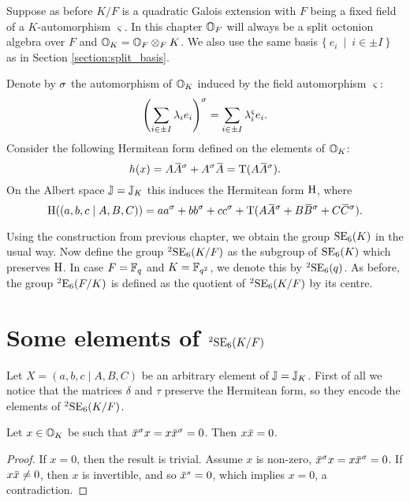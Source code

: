 Suppose as before $K / F$ is a quadratic Galois extension with $F$ being a fixed field of a
$K$-automorphism $\varsigma$. In this chapter $\mathbb{O}_F$ will always be a split octonion algebra 
over $F$ and $\mathbb{O}_K = \mathbb{O}_F \otimes_F K$. We also use the same basis 
$\{\ e_i\ \mid\ i \in \pm I\ \}$ as in Section \ref{section:split_basis}.

Denote by $\sigma$ the automorphism of $\mathbb{O}_K$ induced by the field automorphism 
$\varsigma$:
\begin{equation}
	\left( \sum_{i\in \pm I} \lambda_i e_i \right)^{\sigma} = 
	\sum_{i\in \pm I} \lambda_{i}^{\varsigma} e_i. 
\end{equation}
Consider the following Hermitean form defined on the elements of $\mathbb{O}_K$:
\begin{equation}
	h(x) = A \ovA^{\s} + A^{\s} \ovA = \Tr(A \ovA^{\s}).
\end{equation}
On the Albert space $\mathbb{J} = \mathbb{J}_K$ this induces the Hermitean form $\mathrm{H}$, where
\begin{equation}
	\H( (a,b,c\mid A,B,C) ) = 
		a a^{\s} + b b^{\s} + c c^{\s} + 
		\Tr(A \ovA^{\s} + B\ovB^{\s} + C\ovC^{\s}).
\end{equation}

Using the construction from previous chapter, we obtain the group $\mathrm{SE}_6(K)$ in the usual 
way. Now define the group ${}^2\mathrm{SE}_6(K/F)$ as the subgroup of $\mathrm{SE}_6(K)$ which preserves 
$\mathrm{H}$. In case $F = \mathbb{F}_q$ and $K = \mathbb{F}_{q^2}$, we denote this by ${}^2\mathrm{SE}_6(q)$. As before,
the group ${}^2\mathrm{E}_6(F/K)$ is defined as the quotient of ${}^2\mathrm{SE}_6(K/F)$ by its centre. 

\section{Some elements of ${}^2\mathrm{SE}_6(K/F)$}

Let $X = (a,b,c\mid A,B,C)$ be an arbitrary element of $\mathbb{J} = \mathbb{J}_K$. First of all we notice that 
the matrices $\delta$ and $\tau$ preserve the Hermitean form, so they encode the elements of 
${}^2\mathrm{SE}_6(K/F)$. 

\begin{lemma}
	\label{lemma:3_isotropic}
	Let $x \in \mathbb{O}_K$ be such that $\ovx^{\s} x = x \ovx^{\s} = 0$. Then $x\mathord{\mbox{\hspace*{0pt}}\,\overline{\!x\!\!\;}\!\:}\mbox{\hspace*{0pt}} = 0$.
\end{lemma}

\begin{proof}
	If $x = 0$, then the result is trivial. Assume $x$ is non-zero, $\ovx^{\s} x = x\ovx^{\s} = 0$.
	If $x \mathord{\mbox{\hspace*{0pt}}\,\overline{\!x\!\!\;}\!\:}\mbox{\hspace*{0pt}} \neq 0$, then $x$ is invertible, and so $\mathord{\mbox{\hspace*{0pt}}\,\overline{\!x\!\!\;}\!\:}\mbox{\hspace*{0pt}}^{s} = 0$, which implies $x = 0$, a 
	contradiction.
\end{proof}

